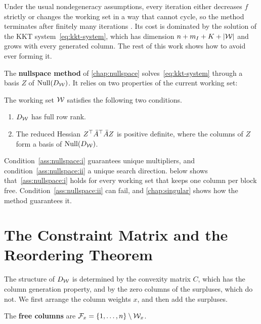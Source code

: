 Under the usual nondegeneracy assumptions, every iteration either decreases $f$ strictly or
changes the working set in a way that cannot cycle, so the method terminates after finitely
many iterations \cite{nocedal2006numerical, fletcher1971quadratic, gill1981practical}. Its cost is dominated by
the solution of the KKT system~\eqref{eq:kkt-system}, which has dimension
$n + m_I + K + |\mathcal{W}|$ and grows with every generated column. The rest of this work shows
how to avoid ever forming it.


The \textbf{nullspace method} of \cref{chap:nullspace} solves~\eqref{eq:kkt-system} through
a basis $Z$ of $\operatorname{Null}(D_{\mathcal{W}})$. It relies on two properties of the current working set:

\begin{assumption} \label{ass:nullspace}
The working set $\mathcal{W}$ satisfies the following two conditions.
\begin{enumerate}
    \item \label{ass:nullspace:i} $D_{\mathcal{W}}$ has full row rank.
    \item \label{ass:nullspace:ii} The reduced Hessian $Z^\top\bar{A}^\top\bar{A} Z$ is positive definite, where the columns
          of $Z$ form a basis of $\operatorname{Null}(D_{\mathcal{W}})$.
\end{enumerate}
\end{assumption}

Condition~\ref{ass:nullspace:i} guarantees unique multipliers, and condition~\ref{ass:nullspace:ii} a unique search direction.
 below shows that~\ref{ass:nullspace:i} holds for every working set that keeps one column per
block free. Condition~\ref{ass:nullspace:ii} can fail, and \cref{chap:singular} shows how the method
guarantees it.


\section{The Constraint Matrix and the Reordering Theorem}
\label{sec:reordering}

The structure of $D_{\mathcal{W}}$ is determined by the convexity matrix $C$, which has the column
generation property, and by the zero columns of the surpluses, which do not. We first
arrange the column weights $x$, and then add the surpluses.

\begin{definition} \label{def:free-columns}
The \textbf{free columns} are $\mathcal{F}_x = \{1,\dots,n\}\setminus\mathcal{W}_x$.
\end{definition}

